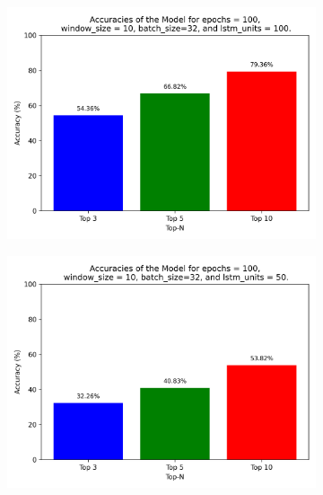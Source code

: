 \begin{figure}[h!]
    \centering

    \begin{subfigure}[b]{0.45\textwidth}
        \centering
        \includegraphics[scale=0.5]{images/accuracy_epochs_100_window_10_batch_32_lstm_100.png}
    \end{subfigure}
    \hfill
    \begin{subfigure}[b]{0.45\textwidth}
        \centering
        \includegraphics[scale=0.5]{images/accuracy_epochs_100_window_10_batch_32_lstm_50.png}
    \end{subfigure}

    \vspace{3em}


\end{figure}
